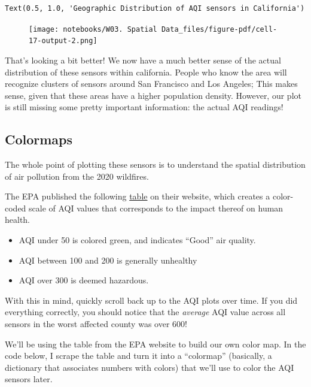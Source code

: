 \documentclass[
  letterpaper,
  DIV=11,
  numbers=noendperiod]{scrreprt}
\providecommand{\tightlist}{%
  \setlength{\itemsep}{0pt}\setlength{\parskip}{0pt}}\usepackage{longtable,booktabs,array}
\begin{document}
\begin{verbatim}
Text(0.5, 1.0, 'Geographic Distribution of AQI sensors in California')
\end{verbatim}

\begin{figure}[H]

{\centering \texttt{[image: notebooks/W03. Spatial Data\_files/figure-pdf/cell-17-output-2.png]}

}

\end{figure}

That's looking a bit better! We now have a much better sense of the
actual distribution of these sensors within california. People who know
the area will recognize clusters of sensors around San Francisco and Los
Angeles; This makes sense, given that these areas have a higher
population density. However, our plot is still missing some pretty
important information: the actual AQI readings!

\hypertarget{colormaps}{%
\subsection{Colormaps}\label{colormaps}}

The whole point of plotting these sensors is to understand the spatial
distribution of air pollution from the 2020 wildfires.

The EPA published the following
\href{https://www.airnow.gov/aqi/aqi-basics/}{table} on their website,
which creates a color-coded scale of AQI values that corresponds to the
impact thereof on human health.

\begin{itemize}
\tightlist
\item
  AQI under 50 is colored green, and indicates ``Good'' air quality.
\item
  AQI between 100 and 200 is generally unhealthy
\item
  AQI over 300 is deemed hazardous.
\end{itemize}

With this in mind, quickly scroll back up to the AQI plots over time. If
you did everything correctly, you should notice that the \emph{average}
AQI value across all sensors in the worst affected county was over 600!

We'll be using the table from the EPA website to build our own color
map. In the code below, I scrape the table and turn it into a
``colormap'' (basically, a dictionary that associates numbers with
colors) that we'll use to color the AQI sensors later.
\end{document}
